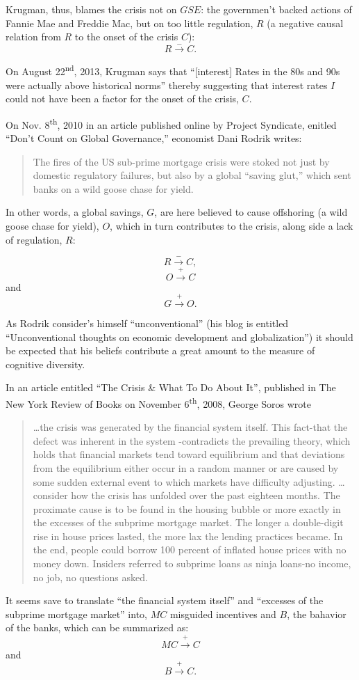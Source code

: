 \documentclass[12pt]{article}
\newcommand{\ts}{\textsuperscript}
\begin{document}
Krugman, thus, blames the crisis not on $GSE$: the governmen't backed actions of Fannie Mae and Freddie Mac, but on too little regulation, $R$ (a negative causal relation from $R$ to the onset of the crisis $C$):
$$R \xrightarrow{-} C.$$

On August 22\ts{nd}, 2013, Krugman says that ``[interest] Rates in the 80s and 90s were actually above historical norms'' thereby suggesting that interest rates $I$ could not have been a factor for the onset of the crisis, $C$.

On Nov. 8\ts{th}, 2010 in an article published online by Project Syndicate, enitled ``Don't Count on Global Governance,'' economist Dani Rodrik writes:

\begin{quotation}
The fires of the US sub-prime mortgage crisis were stoked not just by domestic regulatory failures, but also by a global ``saving glut,'' which sent banks on a wild goose chase for yield.
\end{quotation}

In other words, a global savings, $G$, are here believed to cause offshoring (a wild goose chase for yield), $O$, which in turn contributes to the crisis, along side a lack of regulation, $R$:

$$R \xrightarrow{-} C,$$
$$O \xrightarrow{+} C$$
and
$$G \xrightarrow{+} O.$$

As Rodrik consider's himself ``unconventional'' (his blog is entitled ``Unconventional thoughts on economic development and globalization'') it should be expected that his beliefs contribute a great amount to the measure of cognitive diversity.

In an article entitled ``The Crisis \& What To Do About It'', published in The New York Review of Books on November 6\ts{th}, 2008, George Soros wrote
\begin{quotation}
\ldots the crisis was generated by the financial system itself. This fact-that the defect was inherent in the system -contradicts the prevailing theory, which holds that financial markets tend toward equilibrium and that deviations from the equilibrium either occur in a random manner or are caused by some sudden external event to which markets have difficulty adjusting. \ldots consider how the crisis has unfolded over the past eighteen months. The proximate cause is to be found in the housing bubble or more exactly in the excesses of the subprime mortgage market. The longer a double-digit rise in house prices lasted, the more lax the lending practices became. In the end, people could borrow 100 percent of inflated house prices with no money down. Insiders referred to subprime loans as ninja loans-no income, no job, no questions asked.
\end{quotation}

It seems save to translate ``the financial system itself'' and ``excesses of the subprime mortgage market'' into, $MC$ misguided incentives and $B$, the bahavior of the banks, which can be summarized as:
$$MC \xrightarrow{+} C$$
and
$$B \xrightarrow{+} C.$$

\end{document}
